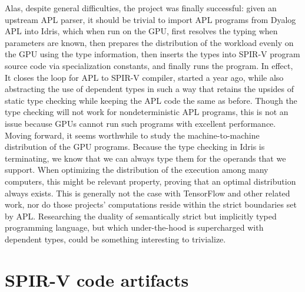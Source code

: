 \documentclass{report}
\begin{document}
Alas, despite general difficulties, the project was finally successful: given an upstream APL parser, it should be trivial to import APL programs from Dyalog APL into Idris, which when run on the GPU, first resolves the typing when parameters are known, then prepares the distribution of the workload evenly on the GPU using the type information, then inserts the types into SPIR-V program source code via specialization constants, and finally runs the program. In effect, It closes the loop for APL to SPIR-V compiler, started a year ago, while also abstracting the use of dependent types in such a way that retains the upsides of static type checking while keeping the APL code the same as before. Though the type checking will not work for nondeterministic APL programs, this is not an issue because GPUs cannot run such programs with excellent performance. Moving forward, it seems worthwhile to study the machine-to-machine distribution of the GPU programs. Because the type checking in Idris is terminating, we know that we can always type them for the operands that we support. When optimizing the distribution of the execution among many computers, this might be relevant property, proving that an optimal distribution always exists. This is generally not the case with TensorFlow and other related work, nor do those projects' computations reside within the strict boundaries set by APL. Researching the duality of semantically strict but implicitly typed programming language, but which under-the-hood is supercharged with dependent types, could be something interesting to trivialize.

\appendix
\chapter{SPIR-V code artifacts}
\end{document}

